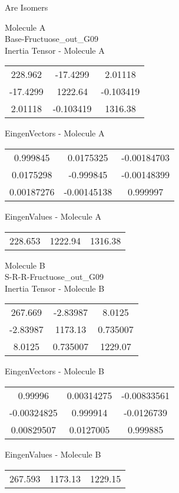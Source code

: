 \begin{center}
\vtab
\vtab
\textcolor{NavyBlue}{\Large Are Isomers}
\end{center}
\newpage
\begin{multicols}{2}
\begin{center}
Molecule A \\ 
Base-Fructuose\_out\_G09
\\
Inertia Tensor - Molecule A \\
\vtab
\begin{tabular}{|c c c|}
228.962	 & 	-17.4299	 & 	2.01118	 \\
-17.4299	 & 	1222.64	 & 	-0.103419	 \\
2.01118	 & 	-0.103419	 & 	1316.38
\end{tabular}

\vtab
 EingenVectors - Molecule A     \\
\vtab
\begin{tabular}{|c c c|}
0.999845	 & 	0.0175325	 & 	-0.00184703	 \\
0.0175298	 & 	-0.999845	 & 	-0.00148399	 \\
0.00187276	 & 	-0.00145138	 & 	0.999997
\end{tabular}

\vtab
 EingenValues - Molecule A     \\
\vtab
\begin{tabular}{|c c c|}
228.653	 & 	1222.94	 & 	1316.38
\end{tabular}
\columnbreak

Molecule B \\ 
S-R-R-Fructuose\_out\_G09
\\
Inertia Tensor - Molecule B \\
\vtab
\begin{tabular}{|c c c|}
267.669	 & 	-2.83987	 & 	8.0125	 \\
-2.83987	 & 	1173.13	 & 	0.735007	 \\
8.0125	 & 	0.735007	 & 	1229.07
\end{tabular}

\vtab
 EingenVectors - Molecule B     \\
\vtab
\begin{tabular}{|c c c|}
0.99996	 & 	0.00314275	 & 	-0.00833561	 \\
-0.00324825	 & 	0.999914	 & 	-0.0126739	 \\
0.00829507	 & 	0.0127005	 & 	0.999885
\end{tabular}

\vtab
 EingenValues - Molecule B     \\
\vtab
\begin{tabular}{|c c c|}
267.593	 & 	1173.13	 & 	1229.15
\end{tabular}

\end{center}
\end{multicols}
